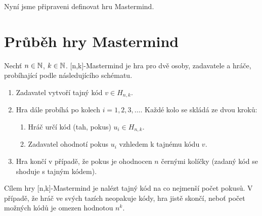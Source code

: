 
Nyní jsme připraveni definovat hru Mastermind. 

\section{Průběh hry Mastermind}
Nechť $n \in \mathbb{N} $, $k \in \mathbb{N}$. [n,k]-Mastermind je hra pro dvě osoby, zadavatele a hráče, 
probíhající podle následujícího schématu. 
\begin{enumerate}
    \item Zadavatel vytvoří tajný kód $v \in H_{n,k}$.
    \item Hra dále probíhá po kolech $i = 1,2,3,\dots$. Každé kolo se skládá ze dvou kroků:
        \begin{enumerate}
            \item Hráč určí kód (tah, pokus) $u_i \in H_{n,k}$.
            \item Zadavatel ohodnotí pokus $u_i$ vzhledem k tajnému kódu $v$. 
        \end{enumerate}
    \item Hra končí v případě, že pokus je ohodnocen $n$ černými kolíčky (zadaný kód se shoduje s tajným kódem). 
\end{enumerate}
Cílem hry [n,k]-Mastermind je nalézt tajný kód na co nejmenší počet pokusů. V případě, že hráč ve svých tazích neopakuje kódy, hra jistě skončí, neboť počet možných kódů je omezen hodnotou $n^k$.





